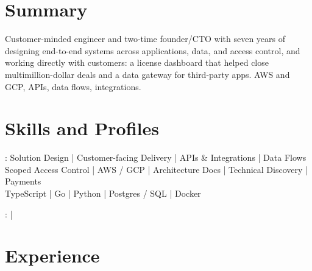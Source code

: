 \documentclass[print]{jack-resume}
\begin{document}
\pagecolor{darkmodeBackground}


\begin{minipage}[t][1cm][t]{.03\textwidth}
    \hfill
\end{minipage}

\section{Summary}
Customer-minded engineer and two-time founder/CTO with seven years of designing end-to-end systems across applications, data, and access control, and working directly with customers: a license dashboard that helped close multimillion-dollar deals and a data gateway for third-party apps. AWS and GCP, APIs, data flows, integrations.
\sectionsep

\section{Skills and Profiles}
:
Solution Design \hfill | \hfill
Customer-facing Delivery \hfill | \hfill
APIs \& Integrations \hfill | \hfill
Data Flows \\
\hspace{1.0cm} Scoped Access Control \hfill | \hfill
AWS / GCP \hfill | \hfill
Architecture Docs \hfill | \hfill
Technical Discovery \hfill | \hfill
Payments \\
\hspace{1.0cm} TypeScript \hfill | \hfill
Go \hfill | \hfill
Python \hfill | \hfill
Postgres / SQL \hfill | \hfill
Docker \\

\raggedright{
    :
      \href{https://www.linkedin.com/in/jack-sturtevant/}{ \ExternalLink} |
     \href{https://github.com/jacksturt}{ \ExternalLink}}

\section{Experience}
\end{document}
